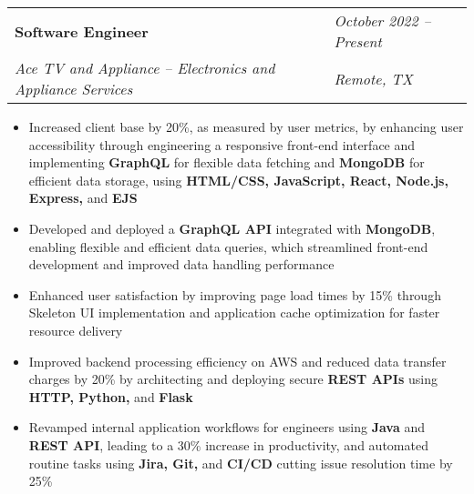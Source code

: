 \documentclass[a4paper,10.5pt]{article}
\begin{document}
\begin{tabular}{@{}p{\dimexpr\linewidth-6cm}@{}p{6cm}@{}}
\textbf{Software Engineer} &\hfill \textit{October 2022 – Present} \\
\vspace{-0.9em} %

\textit{Ace TV and Appliance – Electronics and Appliance Services}& \hfill \textit{Remote, TX} \\
\end{tabular}
\vspace{-1.3em} %
\begin{itemize}[topsep=0pt, partopsep=0pt, parsep=0pt, itemsep=0pt]
    \item Increased client base by 20\%, as measured by user metrics, by enhancing user accessibility through engineering a responsive front-end interface and implementing \textbf{GraphQL} for flexible data fetching and \textbf{MongoDB} for efficient data storage, using \textbf{HTML/CSS, JavaScript, React, Node.js, Express,} and \textbf{EJS}
    \item Developed and deployed a \textbf{GraphQL API} integrated with \textbf{MongoDB}, enabling flexible and efficient data queries, which streamlined front-end development and improved data handling performance
    \item Enhanced user satisfaction by improving page load times by 15\% through Skeleton UI implementation and application cache optimization for faster resource delivery
    \item Improved backend processing efficiency on AWS and reduced data transfer charges by 20\% by architecting and deploying secure \textbf{REST APIs} using \textbf{HTTP, Python,} and \textbf{Flask}
    \item Revamped internal application workflows for engineers using \textbf{Java} and \textbf{REST API}, leading to a 30\% increase in productivity, and automated routine tasks using \textbf{Jira, Git,} and \textbf{CI/CD} cutting issue resolution time by 25\%
\end{itemize}
\vspace{-0.3em} %
\end{document}
